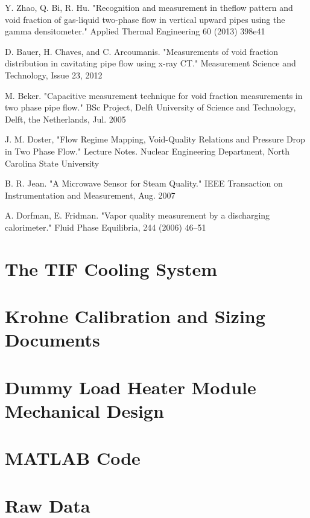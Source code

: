 \documentclass{report}
\begin{document}
\begin{thebibliography}{9}
Y. Zhao, Q. Bi, R. Hu. "Recognition and measurement in theflow pattern and void fraction of gas-liquid two-phase flow in vertical upward pipes using the gamma densitometer." Applied Thermal Engineering 60 (2013) 398e41

D. Bauer, H. Chaves, and C. Arcoumanis. "Measurements of void fraction distribution in cavitating pipe flow
using x-ray CT." Measurement Science and Technology, Issue 23, 2012

M. Beker. "Capacitive measurement technique for void fraction measurements in two phase pipe flow." BSc Project, Delft University of Science and Technology, Delft, the Netherlands, Jul. 2005

J. M. Doster, "Flow Regime Mapping, Void-Quality Relations and Pressure Drop in Two Phase Flow." Lecture Notes. Nuclear Engineering Department, North Carolina State University 

B. R. Jean. "A Microwave Sensor for Steam Quality." IEEE Transaction on Instrumentation and Measurement, Aug. 2007

A. Dorfman, E. Fridman. "Vapor quality measurement by a discharging calorimeter." Fluid Phase Equilibria, 244 (2006) 46–51

\end{thebibliography}
\appendix
\chapter{The TIF Cooling System}\label{app:TIF}


\chapter{Krohne Calibration and Sizing Documents}
%



\chapter{Dummy Load Heater Module Mechanical Design} \label{app:DummyLoad}



\chapter{MATLAB Code}
\chapter{Raw Data}
\end{document}

